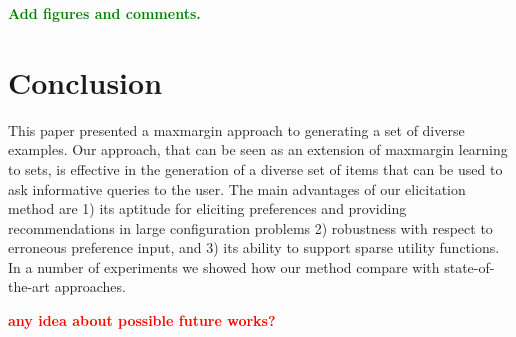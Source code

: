 \documentclass{article}
\renewcommand\[{\begin{equation}}
\renewcommand\]{\end{equation}}
\newcommand{\stefano}[1]{{\bf \textcolor{green}{{\fbox{Stefano:} #1}}}}
\newcommand{\paolo}[1]{{\bf \textcolor{red}{{\fbox{Paolo:} #1}}}}
\begin{document}

\stefano{Add figures and comments.}

\section{Conclusion}
\label{sec:conclusions}

This paper presented a maxmargin approach to generating a set of diverse examples.
Our approach, that can be seen as an extension of maxmargin learning to sets, is effective in the generation of a diverse set of items that can be used to ask informative queries to the user.
The main advantages of our elicitation method are 1) its aptitude for eliciting preferences and providing recommendations in large configuration problems  2) robustness with respect to erroneous preference input, and 3) its ability to support sparse utility functions.
In a number of experiments we showed how our method compare with state-of-the-art approaches.

\paolo{any idea about possible future works?}





\onecolumn
\end{document}
